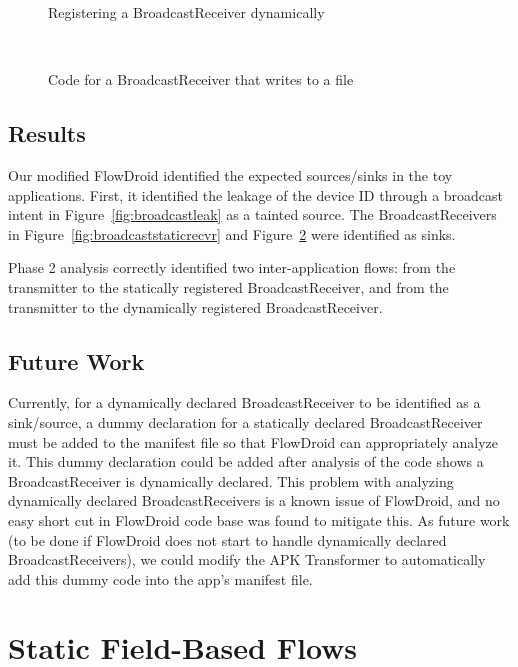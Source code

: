 \begin{figure}[!h]

\caption{Registering a BroadcastReceiver dynamically}
\label{fig:broadcastregister}
\end{figure}

\
\begin{figure}[!h]

\caption{Code for a BroadcastReceiver that writes to a file}
\label{fig:broadcastdynrecvr}
\end{figure}

\subsection{Results}

Our modified FlowDroid identified the expected sources/sinks in the toy applications. First, it identified the leakage of the device ID through a broadcast intent in Figure~\ref{fig:broadcastleak} as a tainted source. The BroadcastReceivers in Figure~\ref{fig:broadcaststaticrecvr} and Figure~\ref{fig:broadcastdynrecvr} were identified as sinks.

Phase 2 analysis correctly identified two inter-application flows: from the transmitter to the statically registered BroadcastReceiver, and from the transmitter to the dynamically registered BroadcastReceiver.

\subsection{Future Work}
Currently, for a dynamically declared BroadcastReceiver to be identified as a sink/source, a dummy declaration for a statically declared BroadcastReceiver must be added to the manifest file so that FlowDroid can appropriately analyze it. This dummy declaration could be added after analysis of the code shows a BroadcastReceiver is dynamically declared. This problem with analyzing dynamically declared BroadcastReceivers is a known issue of FlowDroid, and no easy short cut in FlowDroid code base was found to mitigate this. As future work (to be done if FlowDroid does not start to handle dynamically declared BroadcastReceivers), we could modify the APK Transformer to automatically add this dummy code into the app's manifest file.


\section{Static Field-Based Flows}

